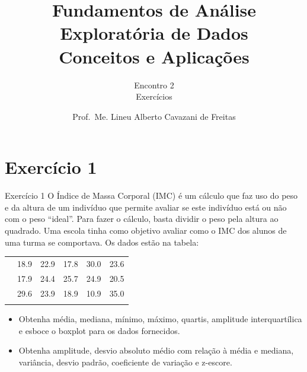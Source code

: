 \documentclass[
  ignorenonframetext,
  serif,
  professionalfont,
  usenames,
  dvipsnames,
  aspectratio = 169]{beamer}
\title{\hfill\break
\textbf{Fundamentos de Análise Exploratória de Dados}\\
Conceitos e Aplicações}
\subtitle{\hfill\break
Encontro 2\\
Exercícios}
\author{Prof.~Me. Lineu Alberto Cavazani de Freitas \vspace{-0.5cm}}
\date{}
\begin{document}
\frame{\titlepage}

\section{Exercício 1}\label{exercuxedcio-1}

\begin{frame}{Exercício 1}
\label{exercuxedcio-1-1}
O Índice de Massa Corporal (IMC) é um cálculo que faz uso do peso e da
altura de um indivíduo que permite avaliar se este indivíduo está ou não
com o peso ``ideal''. Para fazer o cálculo, basta dividir o peso pela
altura ao quadrado. Uma escola tinha como objetivo avaliar como o IMC
dos alunos de uma turma se comportava. Os dados estão na tabela:

\begin{longtable}[]{@{}lrrrrr@{}}
\toprule\noalign{}
\endhead
& 18.9 & 22.9 & 17.8 & 30.0 & 23.6 \\
& 17.9 & 24.4 & 25.7 & 24.9 & 20.5 \\
& 29.6 & 23.9 & 18.9 & 10.9 & 35.0 \\
\bottomrule\noalign{}
\end{longtable}

\begin{itemize}
\item
  Obtenha média, mediana, mínimo, máximo, quartis, amplitude
  interquartílica e esboce o boxplot para os dados fornecidos.
\item
  Obtenha amplitude, desvio absoluto médio com relação à média e
  mediana, variância, desvio padrão, coeficiente de variação e z-escore.
\end{itemize}
\end{frame}
\end{document}
